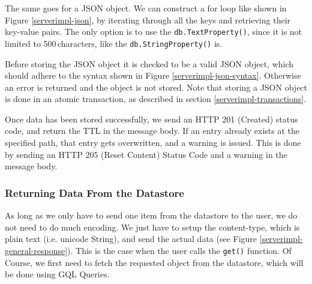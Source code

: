 The same goes for a JSON object. We can construct a for loop like shown in Figure
\ref{serverimpl-json}, by iterating through all the keys and retrieving their
key-value pairs. The only option is to use the \texttt{db.TextProperty()}, since
it is not limited to 500\,characters, like the \texttt{db.StringProperty()} is.

Before storing the JSON object it is checked to be a valid JSON object, which
should adhere to the syntax shown in Figure \ref{serverimpl-json-syntax}.
Otherwise an error is returned and the object is not stored. Note that storing a
JSON object is done in an atomic transaction, as described in section
\ref{serverimpl-transactions}.

Once data has been stored successfully, we send an HTTP 201 (Created) status
code, and return the TTL in the message body. If an entry already exists at the
specified path, that entry gets overwritten, and a warning is issued. This is
done by sending an HTTP 205 (Reset Content) Status Code and a warning in the
message body.

\begin{figure*}[ht] %
\begin{center}
\begin{code}
\end{code}
\caption{Advert Syntax of a JSON Object.\label{serverimpl-json-syntax}}
\end{center}
\end{figure*}


\subsubsection{Returning Data From the Datastore}
As long as we only have to send one item from the datastore to the user, we do
not need to do much encoding. We just have to setup the content-type, which is
plain text (i.e. unicode String), and send the actual data (see Figure
\ref{serverimpl-general-response}). This is the case when the user calls the
\texttt{get()} function. Of Course, we first need to fetch the requested object
from the datastore, which will be done using GQL Queries.

